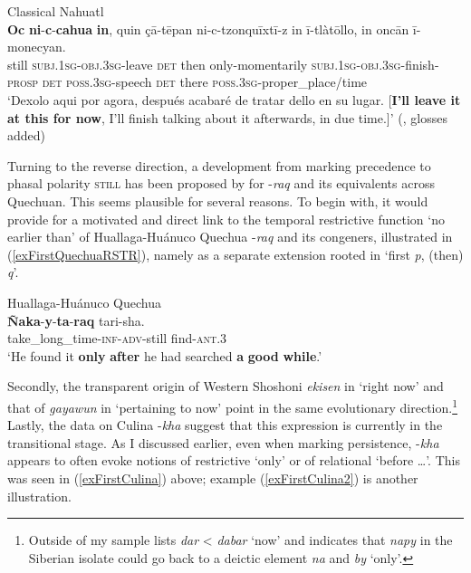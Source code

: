 \begin{exe}
	\ex Classical Nahuatl\label{exFirstClassicalNahuatl}\\
	\gll \textbf{Oc} \textbf{ni}-\textbf{c}-\textbf{cahua} \textbf{in}, quin çā-tēpan ni-c-tzonquīxtī-z in ī-tlàtōllo, in oncān ī-monecyan.\\
	still \textsc{subj}.1\textsc{sg}-\textsc{obj}.3\textsc{sg}-leave \textsc{det} then only-momentarily \textsc{subj}.1\textsc{sg}-\textsc{obj}.3\textsc{sg}-finish-\textsc{prosp} \textsc{det} \textsc{poss}.3\textsc{sg}-speech \textsc{det} there \textsc{poss}.3\textsc{sg}-proper\_place/time\\
	\glt \lq Dexolo aqui por agora, después acabaré de tratar dello en su lugar. [\textbf{I’ll leave it at this for now}, I’ll finish talking about it afterwards, in due time.]\rq{ }(\cite[500]{Carochi1645}, glosses added)
\end{exe}

Turning to the reverse direction, a development from marking precedence to phasal polarity \textsc{still} has been proposed by \textcite[90-91]{vanBaar1997} for \mbox{-\textit{raq}} and its equivalents across Quechuan. This seems plausible for several reasons. To begin with, it would provide for a motivated and direct link to the temporal restrictive function \lq no earlier than\rq{ }of Huallaga-Huánuco Quechua \mbox{-\textit{raq}} and its congeners, illustrated in (\ref{exFirstQuechuaRSTR}), namely as a separate extension rooted in \lq first \textit{p}, (then) \textit{q}\rq{}. 

\begin{exe}
\ex Huallaga-Huánuco Quechua\label{exFirstQuechuaRSTR}\\
	\gll \textbf{Ñaka}-\textbf{y}-\textbf{ta}-\textbf{raq} tari-sha.\\
	take\_long\_time-\textsc{inf}-\textsc{adv}-still find-\textsc{ant}.3\\
	\glt \lq He found it \textbf{only} \textbf{after} he had searched \textbf{a} \textbf{good} \textbf{while}.\rq{ }\parencite[132]{Weber1993}
\end{exe}
	
Secondly, the transparent origin of Western Shoshoni \textit{ekisen} in \lq right now\rq{ }and that of  \textit{gayawun} in \lq pertaining to now\rq{ }point in the same evolutionary direction.\footnote{Outside of my sample \textcite[75]{vanderAuwera1998} lists  \textit{dar} < \textit{dabar} \lq now\rq{ }and \textcite[94]{vanBaar1997} indicates that \textit{napy} in the Siberian isolate  could go back to a deictic element \textit{na} and \mbox{\textit{by}} \lq only\rq.} Lastly, the data on Culina \mbox{-\textit{kha}} suggest that this expression is currently in the transitional stage. As I discussed earlier, even when marking persistence, \mbox{-\textit{kha}} appears to often evoke notions of restrictive \lq only\rq{ }or of relational \lq before …\rq{}. This was seen in (\ref{exFirstCulina}) above; example (\ref{exFirstCulina2}) is another illustration.\pagebreak
	

